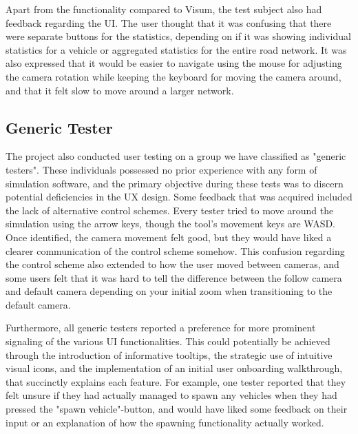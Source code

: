 
        Apart from the functionality compared to Visum, the test subject also had feedback regarding the UI. The user thought that it was confusing that there were separate buttons for the statistics, depending on if it was showing individual statistics for a vehicle or aggregated statistics for the entire road network. It was also expressed that it would be easier to navigate using the mouse for adjusting the camera rotation while keeping the keyboard for moving the camera around, and that it felt slow to move around a larger network.
    \subsection{Generic Tester}
    The project also conducted user testing on a group we have classified as "generic testers". These individuals possessed no prior experience with any form of simulation software, and the primary objective during these tests was to discern potential deficiencies in the UX design. Some feedback that was acquired included the lack of alternative control schemes. Every tester tried to move around the simulation using the arrow keys, though the tool's movement keys are WASD. Once identified, the camera movement felt good, but they would have liked a clearer communication of the control scheme somehow. This confusion regarding the control scheme also extended to how the user moved between cameras, and some users felt that it was hard to tell the difference between the follow camera and default camera depending on your initial zoom when transitioning to the default camera.

    Furthermore, all generic testers reported a preference for more prominent signaling of the various UI functionalities. This could potentially be achieved through the introduction of informative tooltips, the strategic use of intuitive visual icons, and the implementation of an initial user onboarding walkthrough, that succinctly explains each feature. For example, one tester reported that they felt unsure if they had actually managed to spawn any vehicles when they had pressed the "spawn vehicle"-button, and would have liked some feedback on their input or an explanation of how the spawning functionality actually worked.